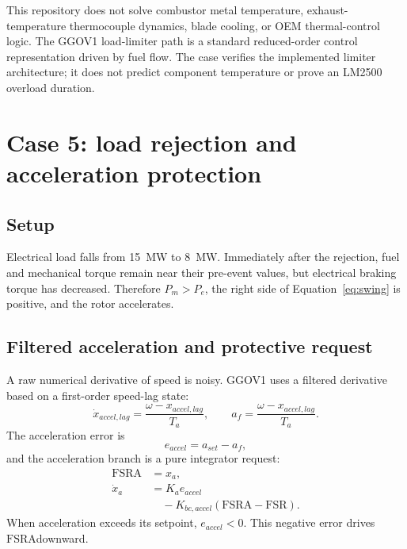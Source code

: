 \documentclass[11pt]{article}
\newcommand{\fsra}{\ensuremath{\mathrm{FSRA}}}
\newcommand{\fsr}{\ensuremath{\mathrm{FSR}}}
\newcommand{\Pe}{\ensuremath{P_{e}}}
\newcommand{\Pm}{\ensuremath{P_{m}}}
\begin{document}
\begin{cautionbox}
This repository does not solve combustor metal temperature, exhaust-temperature
thermocouple dynamics, blade cooling, or OEM thermal-control logic.  The GGOV1
load-limiter path is a standard reduced-order control representation driven by
fuel flow.  The case verifies the implemented limiter architecture; it does not
predict component temperature or prove an LM2500 overload duration.
\end{cautionbox}

\section{Case 5: load rejection and acceleration protection}

\subsection{Setup}
Electrical load falls from \SI{15}{MW} to \SI{8}{MW}.  Immediately after the
rejection, fuel and mechanical torque remain near their pre-event values, but
electrical braking torque has decreased.  Therefore $\Pm>\Pe$, the right side
of Equation~\eqref{eq:swing} is positive, and the rotor accelerates.

\subsection{Filtered acceleration and protective request}
A raw numerical derivative of speed is noisy.  GGOV1 uses a filtered
derivative based on a first-order speed-lag state:
\begin{equation}
  \dot x_{accel,lag}=\frac{\omega-x_{accel,lag}}{T_a},\qquad
  a_f=\frac{\omega-x_{accel,lag}}{T_a}.
\end{equation}
The acceleration error is
\begin{equation}
  e_{accel}=a_{set}-a_f,
\end{equation}
and the acceleration branch is a pure integrator request:
\begin{equation}
  \begin{aligned}
    \fsra &= x_a,\\
    \dot x_a &= K_ae_{accel}\\
             &\quad{}-K_{bc,accel}(\fsra-\fsr).
  \end{aligned}
\end{equation}
When acceleration exceeds its setpoint, $e_{accel}<0$.  This negative error
drives \fsra downward.
\end{document}
